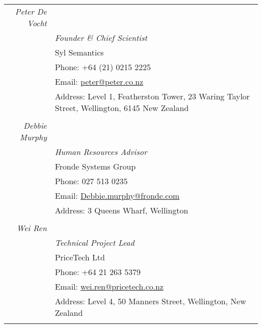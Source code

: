 \documentclass[a4paper,10pt]{article} %
\begin{document}
\begin{tabular}{r|p{11cm}}


\emph{Peter De Vocht}&  \\
& \emph{Founder \& Chief Scientist}\\ 
& Syl Semantics \\
& Phone: +64 (21) 0215 2225\\
& Email: \href{mailto:peter@peter.co.nz}{peter@peter.co.nz}\\
& Address: Level 1, Featherston Tower, 23 Waring Taylor Street, Wellington, 6145 New Zealand \\
\multicolumn{2}{c}{} \\


\emph{Debbie Murphy}&  \\
& \emph{Human Resources Advisor}\\ 
& Fronde Systems Group\\
& Phone:  027 513 0235 \\
& Email: \href{mailto:Debbie.murphy@fronde.com}{Debbie.murphy@fronde.com}\\
& Address: 3 Queens Wharf, Wellington\\
\multicolumn{2}{c}{} \\


\emph{Wei Ren}&  \\
& \emph{Technical Project Lead}\\ 
& PriceTech Ltd\\
& Phone: +64 21 263 5379\\
& Email: \href{mailto:wei.ren@pricetech.co.nz}{wei.ren@pricetech.co.nz}\\
& Address: Level 4, 50 Manners Street, Wellington, New Zealand \\
\multicolumn{2}{c}{} \\




\end{tabular}
\end{document}
